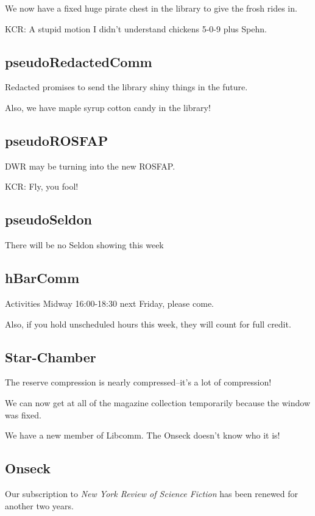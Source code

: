\documentclass[10pt]{article}
\newcommand{\ps}{ plus Spehn\xspace}
\begin{document}
We now have a fixed huge pirate chest in the library to give
the frosh rides in.

KCR: A stupid motion I didn't understand chickens 5-0-9\ps.

\subsection*{pseudoRedactedComm}

Redacted promises to send the library shiny things in the future.

Also, we have maple syrup cotton candy in the library!

\subsection*{pseudoROSFAP}

DWR may be turning into the new ROSFAP.

KCR: Fly, you fool!

\subsection*{pseudoSeldon}

There will be no Seldon showing this week

\subsection*{hBarComm}

Activities Midway 16:00-18:30 next Friday, please come.

Also, if you hold unscheduled hours this week, they will count for
full credit.

\subsection*{Star-Chamber}

The reserve compression is nearly compressed--it's a lot of compression!

We can now get at all of the magazine collection temporarily because
the window was fixed.

We have a new member of Libcomm.  The Onseck doesn't know who it is!

\subsection*{Onseck}

Our subscription to \emph{New York Review of Science Fiction} has
been renewed for another two years.
\end{document}
